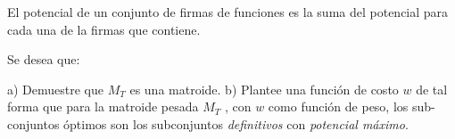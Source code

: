 \documentclass[letterpaper, 12pt]{article}
\begin{document}
\begin{enumerate}
El potencial de un conjunto de firmas de funciones es la suma del potencial para cada una de la firmas que contiene.

Se desea que:

a) Demuestre que $M_T$ es una matroide.
b) Plantee una función de costo $w$ de tal forma que para la matroide pesada $M_T$ , con $w$ como función de peso, los sub-conjuntos óptimos son los subconjuntos \emph{definitivos} con \emph{potencial máximo}.

\end{enumerate} \vspace{4mm}
\end{document}
